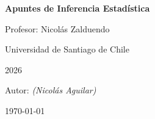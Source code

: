 \documentclass[12pt, a4paper, spanish]{article}
\theoremstyle{definition}
\theoremstyle{plain}
\theoremstyle{remark}
\begin{document}
\begin{titlepage}
  \centering
  \vspace*{2cm}
  {\LARGE\bfseries Apuntes de Inferencia Estadística\par}
    \vspace{0.5cm}
  {\large Profesor: Nicolás Zalduendo\par}
  \vspace{0.3cm}
  \vspace{0.5cm}
  {\large Universidad de Santiago de Chile\par}
  \vspace{0.3cm}
  {\large 2026\par}
  \vfill
  {\normalsize Autor: \textit{(Nicolás Aguilar)}\par}
  \vspace{0.5cm}
  {\small \today\par}
\end{titlepage}

\tableofcontents
\newpage





\end{document}
